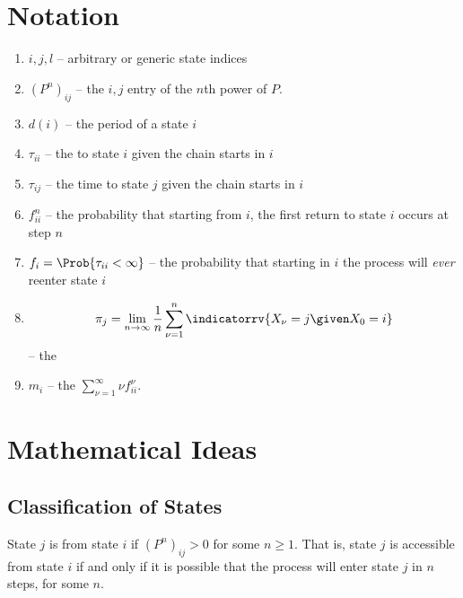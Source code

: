 \documentclass[12pt]{article}
\begin{document}
\hr

\section*{Notation}
\begin{enumerate}
    \item
        \( i, j, l \) -- arbitrary or generic state indices
    \item
        \( (P^n)_{ij} \) -- the \( i,j \) entry of the \( n \)th power
        of \( P \).
      \item  \( d(i) \) -- the period of a state \( i \)
      \item \( \tau_{ii} \) -- the  to
    state \( i \) given the chain starts in \( i \)
      \item \( \tau_{ij} \) -- the time to
    state \( j \) given the chain starts in \( i \)
  \item \( f^n_{ii} \) --  the
    probability that starting from \( i \), the first return to state \(
    i \) occurs at step \( n \)
  \item \( f_i = \Prob{\tau_{ii} < \infty} \)
    -- the probability that starting in \( i \) the process will
    \emph{ever} reenter state \( i \)
  \item     \[
        \pi_j = \lim_{n \to \infty} \frac{1}{n} \sum\limits_{\nu=1}^n
        \indicatorrv{X_{\nu}= j \given X_0 = i}
    \] -- the 
  \item
        \( m_i \) -- the  \( \sum_{\nu=1}^\infty
    \nu f^\nu_{ii} \).
  \end{enumerate}
  
\section*{Mathematical Ideas}

\subsection*{Classification of States}

\begin{definition}
    State \( j \) is  from state \( i \) if \( (P^{n})_
    {ij} > 0 \) for some \( n \ge 1 \).  That is, state \( j \) is
    accessible from state \( i \) if and only if it is possible that the
    process will enter state \( j \) in \( n \) steps, for some \( n \).
\end{definition}
\end{document}
